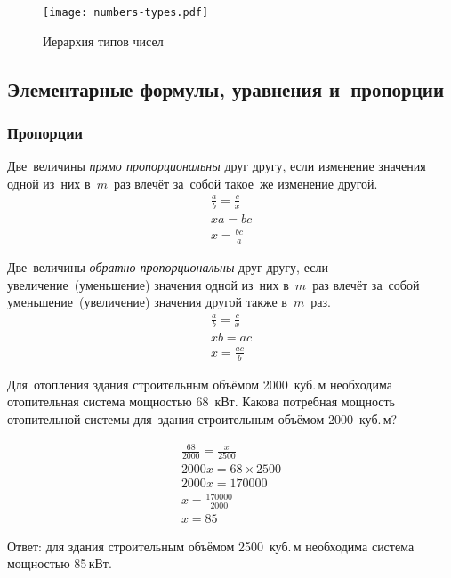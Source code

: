 \documentclass[]{scrartcl}
\begin{document}
\begin{figure}[ht]
	\centering %
	\texttt{[image: numbers-types.pdf]}
	\caption{Иерархия типов чисел \cite{Wiki:numbers-types}}\label{fig:numbers-types}
\end{figure}

\subsection{Элементарные формулы, уравнения и~пропорции}
\subsubsection{Пропорции}

Две~величины \emph{прямо пропорциональны} друг другу, если изменение значения одной из~них в~$m$~раз влечёт за~собой такое~же изменение другой.
\begin{equation}\label{simple-dir-prop1}
	\begin{aligned}
		\frac{a}{b}=\frac{c}{x} \\
		xa = bc \\
		x = \frac{bc}{a}
	\end{aligned}
\end{equation} 

Две~величины \emph{обратно пропорциональны} друг другу, если увеличение~(уменьшение) значения одной из~них в~$m$~раз влечёт за~собой уменьшение~(увеличение) значения другой также в~$m$~раз.
\begin{equation}\label{simple-inv-prop1}
\begin{aligned}
\frac{a}{b}=\frac{c}{x} \\
xb = ac \\
x = \frac{ac}{b}
\end{aligned}
\end{equation}

\begin{Thexmpl}\label{ex:dir-prop}
	Для~отопления здания строительным объёмом 2000~куб.\,м необходима отопительная система мощностью 68~кВт. Какова потребная мощность отопительной системы для~здания строительным объёмом 2000~куб.\,м?
	
	\begin{equation*}\label{ex:-inv-prop}
	\begin{aligned}
	\frac{68}{2000}=\frac{x}{2500} \\
	2000x = 68\times 2500 \\
	2000x = 170000 \\
	x = \frac{170000}{2000} \\
	x = 85
	\end{aligned}
	\end{equation*}
	
	Ответ: для здания строительным объёмом 2500~куб.\,м необходима система мощностью 85\,кВт.
\end{Thexmpl}
\end{document}
